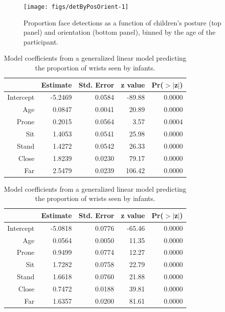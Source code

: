 \documentclass[10pt, letterpaper]{article}
\newenvironment{CodeChunk}{}{}
\begin{document}
\begin{CodeChunk}
\begin{figure}[h]

{\centering \texttt{[image: figs/detByPosOrient-1]} 

}

\caption[Proportion face detections as a function of children's posture (top panel) and orientation (bottom panel), binned by the age of the participant]{Proportion face detections as a function of children's posture (top panel) and orientation (bottom panel), binned by the age of the participant.}\label{fig:detByPosOrient}
\end{figure}
\end{CodeChunk}

\begin{table}[H]
\centering
\begin{tabular}{rrrrr}
  \hline
 & Estimate & Std. Error & z value & Pr($>$$|$z$|$) \\ 
  \hline
Intercept & -5.2469 & 0.0584 & -89.88 & 0.0000 \\ 
  Age & 0.0847 & 0.0041 & 20.89 & 0.0000 \\ 
  Prone & 0.2015 & 0.0564 & 3.57 & 0.0004 \\ 
  Sit & 1.4053 & 0.0541 & 25.98 & 0.0000 \\ 
  Stand & 1.4272 & 0.0542 & 26.33 & 0.0000 \\ 
  Close & 1.8239 & 0.0230 & 79.17 & 0.0000 \\ 
  Far & 2.5479 & 0.0239 & 106.42 & 0.0000 \\ 
   \hline
\end{tabular}
\caption{Model coefficients from a generalized linear model predicting the proportion of wrists seen by infants.} 
\end{table}

\begin{table}[H]
\centering
\begin{tabular}{rrrrr}
  \hline
 & Estimate & Std. Error & z value & Pr($>$$|$z$|$) \\ 
  \hline
Intercept & -5.0818 & 0.0776 & -65.46 & 0.0000 \\ 
  Age & 0.0564 & 0.0050 & 11.35 & 0.0000 \\ 
  Prone & 0.9499 & 0.0774 & 12.27 & 0.0000 \\ 
  Sit & 1.7282 & 0.0758 & 22.79 & 0.0000 \\ 
  Stand & 1.6618 & 0.0760 & 21.88 & 0.0000 \\ 
  Close & 0.7472 & 0.0188 & 39.81 & 0.0000 \\ 
  Far & 1.6357 & 0.0200 & 81.61 & 0.0000 \\ 
   \hline
\end{tabular}
\caption{Model coefficients from a generalized linear model predicting the proportion of wrists seen by infants.} 
\end{table}
\end{document}
